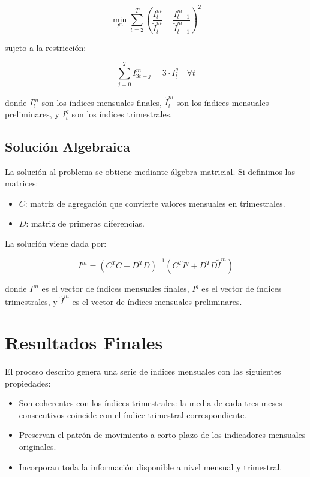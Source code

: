 \documentclass[12pt,a4paper]{article}
\begin{document}
\begin{equation}
\min_{I^m} \sum_{t=2}^{T} \left(\frac{I_t^m}{\tilde{I}_t^m} - \frac{I_{t-1}^m}{\tilde{I}_{t-1}^m}\right)^2
\end{equation}

sujeto a la restricción:

\begin{equation}
\sum_{j=0}^{2} I_{3t+j}^m = 3 \cdot I_t^q \quad \forall t
\end{equation}

donde $I_t^m$ son los índices mensuales finales, $\tilde{I}_t^m$ son los índices mensuales preliminares, y $I_t^q$ son los índices trimestrales.

\subsection{Solución Algebraica}

La solución al problema se obtiene mediante álgebra matricial. Si definimos las matrices:
\begin{itemize}
    \item $C$: matriz de agregación que convierte valores mensuales en trimestrales.
    \item $D$: matriz de primeras diferencias.
\end{itemize}

La solución viene dada por:

\begin{equation}
I^m = \left(C^T C + D^T D\right)^{-1} \left(C^T I^q + D^T D \tilde{I}^m\right)
\end{equation}

donde $I^m$ es el vector de índices mensuales finales, $I^q$ es el vector de índices trimestrales, y $\tilde{I}^m$ es el vector de índices mensuales preliminares.

\section{Resultados Finales}

El proceso descrito genera una serie de índices mensuales con las siguientes propiedades:
\begin{itemize}
    \item Son coherentes con los índices trimestrales: la media de cada tres meses consecutivos coincide con el índice trimestral correspondiente.
    \item Preservan el patrón de movimiento a corto plazo de los indicadores mensuales originales.
    \item Incorporan toda la información disponible a nivel mensual y trimestral.
\end{itemize}
\end{document}
